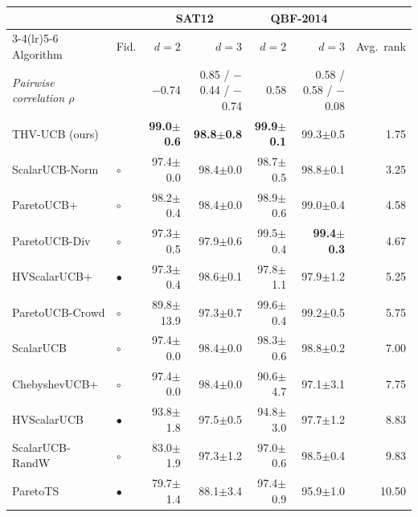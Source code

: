 \begin{tabular}{llrrrrr}
\toprule
 & & \multicolumn{2}{c}{SAT12} & \multicolumn{2}{c}{QBF-2014} & \\
\cmidrule(lr){3-4}\cmidrule(lr){5-6}
Algorithm & Fid. & $d=2$ & $d=3$ & $d=2$ & $d=3$ & Avg.\ rank\\
\midrule
\textit{Pairwise correlation $\rho$} & & {\scriptsize $-$0.74} & {\scriptsize 0.85 / $-$0.44 / $-$0.74} & {\scriptsize 0.58} & {\scriptsize 0.58 / 0.58 / $-$0.08} & \\
\midrule
THV-UCB (ours) &  & \textbf{99.0{\scriptsize$\pm$0.6}} & \textbf{98.8{\scriptsize$\pm$0.8}} & \textbf{99.9{\scriptsize$\pm$0.1}} & 99.3{\scriptsize$\pm$0.5} & 1.75\\
\midrule
ScalarUCB-Norm & $\circ$ & 97.4{\scriptsize$\pm$0.0} & 98.4{\scriptsize$\pm$0.0} & 98.7{\scriptsize$\pm$0.5} & 98.8{\scriptsize$\pm$0.1} & 3.25\\
ParetoUCB+ & $\circ$ & 98.2{\scriptsize$\pm$0.4} & 98.4{\scriptsize$\pm$0.0} & 98.9{\scriptsize$\pm$0.6} & 99.0{\scriptsize$\pm$0.4} & 4.58\\
ParetoUCB-Div & $\circ$ & 97.3{\scriptsize$\pm$0.5} & 97.9{\scriptsize$\pm$0.6} & 99.5{\scriptsize$\pm$0.4} & \textbf{99.4{\scriptsize$\pm$0.3}} & 4.67\\
HVScalarUCB+ & $\bullet$ & 97.3{\scriptsize$\pm$0.4} & 98.6{\scriptsize$\pm$0.1} & 97.8{\scriptsize$\pm$1.1} & 97.9{\scriptsize$\pm$1.2} & 5.25\\
ParetoUCB-Crowd & $\circ$ & 89.8{\scriptsize$\pm$13.9} & 97.3{\scriptsize$\pm$0.7} & 99.6{\scriptsize$\pm$0.4} & 99.2{\scriptsize$\pm$0.5} & 5.75\\
ScalarUCB & $\circ$ & 97.4{\scriptsize$\pm$0.0} & 98.4{\scriptsize$\pm$0.0} & 98.3{\scriptsize$\pm$0.6} & 98.8{\scriptsize$\pm$0.2} & 7.00\\
ChebyshevUCB+ & $\circ$ & 97.4{\scriptsize$\pm$0.0} & 98.4{\scriptsize$\pm$0.0} & 90.6{\scriptsize$\pm$4.7} & 97.1{\scriptsize$\pm$3.1} & 7.75\\
HVScalarUCB & $\bullet$ & 93.8{\scriptsize$\pm$1.8} & 97.5{\scriptsize$\pm$0.5} & 94.8{\scriptsize$\pm$3.0} & 97.7{\scriptsize$\pm$1.2} & 8.83\\
ScalarUCB-RandW & $\circ$ & 83.0{\scriptsize$\pm$1.9} & 97.3{\scriptsize$\pm$1.2} & 97.0{\scriptsize$\pm$0.6} & 98.5{\scriptsize$\pm$0.4} & 9.83\\
ParetoTS & $\bullet$ & 79.7{\scriptsize$\pm$1.4} & 88.1{\scriptsize$\pm$3.4} & 97.4{\scriptsize$\pm$0.9} & 95.9{\scriptsize$\pm$1.0} & 10.50\\

\end{tabular}
